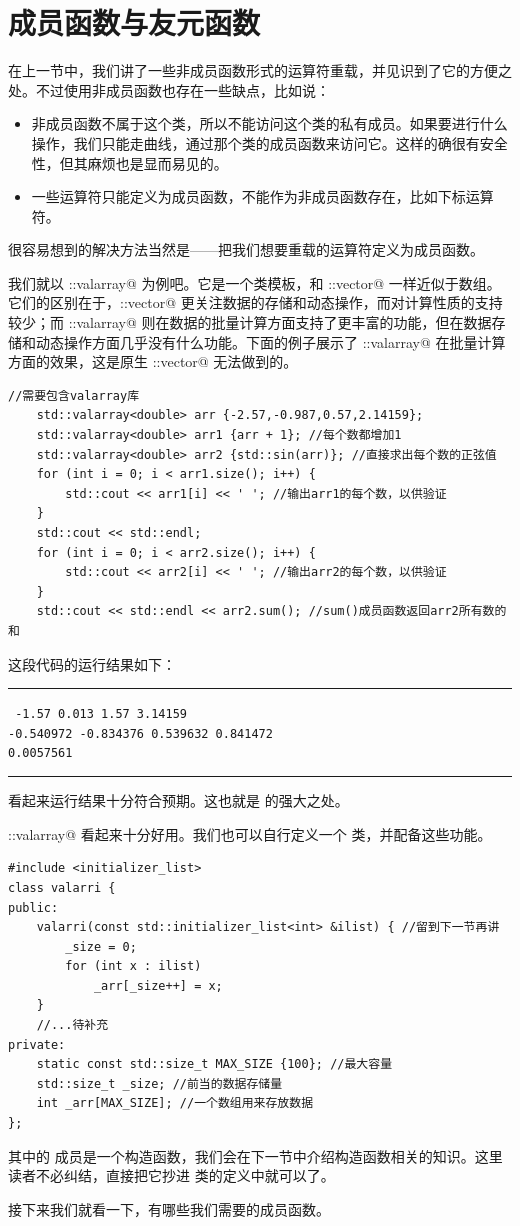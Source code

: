 \section{成员函数与友元函数}
在上一节中，我们讲了一些非成员函数形式的运算符重载，并见识到了它的方便之处。不过使用非成员函数也存在一些缺点，比如说：
\begin{itemize}
    \item 非成员函数不属于这个类，所以不能访问这个类的私有成员。如果要进行什么操作，我们只能走曲线，通过那个类的成员函数来访问它。这样的确很有安全性，但其麻烦也是显而易见的。
    \item 一些运算符只能定义为成员函数，不能作为非成员函数存在，比如下标运算符。
\end{itemize}
很容易想到的解决方法当然是——把我们想要重载的运算符定义为成员函数。\par
我们就以 \lstinline@std::valarray@ 为例吧。它是一个类模板，和 \lstinline@std::vector@ 一样近似于数组。它们的区别在于，\lstinline@std::vector@ 更关注数据的存储和动态操作，而对计算性质的支持较少；而 \lstinline@std::valarray@ 则在数据的批量计算方面支持了更丰富的功能，但在数据存储和动态操作方面几乎没有什么功能。下面的例子展示了 \lstinline@std::valarray@ 在批量计算方面的效果，这是原生 \lstinline@std::vector@ 无法做到的。
\begin{lstlisting}
//需要包含valarray库
    std::valarray<double> arr {-2.57,-0.987,0.57,2.14159};
    std::valarray<double> arr1 {arr + 1}; //每个数都增加1
    std::valarray<double> arr2 {std::sin(arr)}; //直接求出每个数的正弦值
    for (int i = 0; i < arr1.size(); i++) {
        std::cout << arr1[i] << ' '; //输出arr1的每个数，以供验证
    }
    std::cout << std::endl;
    for (int i = 0; i < arr2.size(); i++) {
        std::cout << arr2[i] << ' '; //输出arr2的每个数，以供验证
    }
    std::cout << std::endl << arr2.sum(); //sum()成员函数返回arr2所有数的和
\end{lstlisting}
这段代码的运行结果如下：\\\noindent\rule{\linewidth}{.2pt}\texttt{
-1.57 0.013 1.57 3.14159\\
-0.540972 -0.834376 0.539632 0.841472\\
0.0057561
}\\\noindent\rule{\linewidth}{.2pt}
看起来运行结果十分符合预期。这也就是 \lstinline@valarray@ 的强大之处。\par
\lstinline@std::valarray@ 看起来十分好用。我们也可以自行定义一个 \lstinline@valarri@ 类，并配备这些功能。
\begin{lstlisting}
#include <initializer_list>
class valarri {
public:
    valarri(const std::initializer_list<int> &ilist) { //留到下一节再讲
        _size = 0;
        for (int x : ilist)
            _arr[_size++] = x;
    }
    //...待补充
private:
    static const std::size_t MAX_SIZE {100}; //最大容量
    std::size_t _size; //前当的数据存储量
    int _arr[MAX_SIZE]; //一个数组用来存放数据
};
\end{lstlisting}
其中的 \lstinline@valarri@ 成员是一个构造函数，我们会在下一节中介绍构造函数相关的知识。这里读者不必纠结，直接把它抄进 \lstinline@valarri@ 类的定义中就可以了。\par
接下来我们就看一下，有哪些我们需要的成员函数。\par
